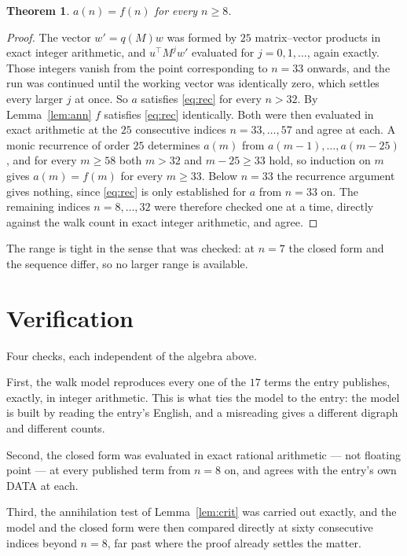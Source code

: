 \documentclass[11pt,a4paper]{article}
\theoremstyle{plain}
\newtheorem{theorem}{Theorem}
\theoremstyle{definition}
\begin{document}
\begin{theorem}
$a(n)=f(n)$ for every $n\ge8$.
\end{theorem}

\begin{proof}
The vector $w'=q(M)w$ was formed by $25$ matrix--vector products in exact integer
arithmetic, and $u^{\!\top}M^{j}w'$ evaluated for $j=0,1,\dots$, again exactly. Those integers
vanish from the point corresponding to $n=33$ onwards, and the run was continued until the
working vector was identically zero, which settles every larger $j$ at once. So $a$ satisfies
\eqref{eq:rec} for every $n>32$. By Lemma~\ref{lem:ann} $f$ satisfies \eqref{eq:rec}
identically. Both were then evaluated in exact arithmetic at the $25$ consecutive indices
$n=33,\dots,57$ and agree at each. A monic recurrence of order $25$
determines $a(m)$ from $a(m-1),\dots,a(m-25)$, and for every $m\ge58$ both
$m>32$ and $m-25\ge33$ hold, so induction on $m$ gives $a(m)=f(m)$ for every
$m\ge33$.
Below $n=33$ the recurrence argument gives nothing, since \eqref{eq:rec} is only
established for $a$ from $n=33$ on. The remaining indices $n=8,\dots,32$ were
therefore checked one at a time, directly against the walk count in exact integer arithmetic,
and agree.
\end{proof}

The range is tight in the sense that was checked: at $n=7$ the closed form and the sequence differ, so no larger range is available.

\section{Verification}

Four checks, each independent of the algebra above.

First, the walk model reproduces every one of the $17$ terms the entry publishes,
exactly, in integer arithmetic. This is what ties the model to the entry: the model is built
by reading the entry's English, and a misreading gives a different digraph and different
counts.

Second, the closed form was evaluated in exact rational arithmetic --- not floating point ---
at every published term from $n=8$ on, and agrees with the entry's own DATA at each.

Third, the annihilation test of Lemma~\ref{lem:crit} was carried out exactly, and the model
and the closed form were then compared directly at sixty consecutive indices beyond
$n=8$, far past where the proof already settles the matter.
\end{document}

